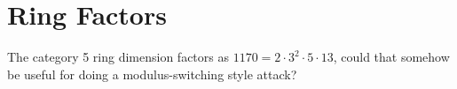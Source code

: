 \section{Ring Factors}
\label{sec:ring_fact}

The category 5 ring dimension factors as 
$1170=2\cdot 3^2\cdot 5 \cdot 13$, could that somehow be useful for
doing a modulus-switching style attack? 

